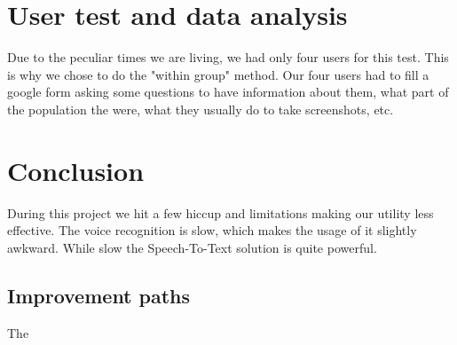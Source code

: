 \section{User test and data analysis}
Due to the peculiar times we are living, we had only four users for this test. This is why we chose to do the "within group" method.
Our four users had to fill a google form asking some questions to have information about them, what part of the population the were, what they usually do to take screenshots, etc.


\section{Conclusion}

During this project we hit a few hiccup and limitations making our utility less effective. The voice recognition is slow, which makes the usage of it slightly awkward. While slow the Speech-To-Text solution is quite powerful. 

\subsection*{Improvement paths}
The 